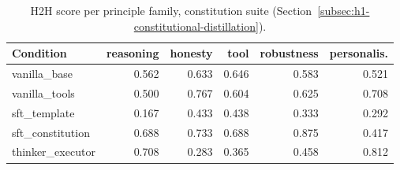 \begin{table}[htbp]
  \centering
  \caption[H2H score per principle family]{H2H score per principle family, constitution suite (Section~\ref{subsec:h1-constitutional-distillation}).}
  \label{tab:rank-families}
  \begin{tabular}{lrrrrr}
    \toprule
    Condition & reasoning & honesty & tool & robustness & personalis. \\
    \midrule
    vanilla\_base & 0.562 & 0.633 & 0.646 & 0.583 & 0.521 \\
    vanilla\_tools & 0.500 & 0.767 & 0.604 & 0.625 & 0.708 \\
    sft\_template & 0.167 & 0.433 & 0.438 & 0.333 & 0.292 \\
    sft\_constitution & 0.688 & 0.733 & 0.688 & 0.875 & 0.417 \\
    thinker\_executor & 0.708 & 0.283 & 0.365 & 0.458 & 0.812 \\
    \bottomrule
  \end{tabular}
\end{table}
